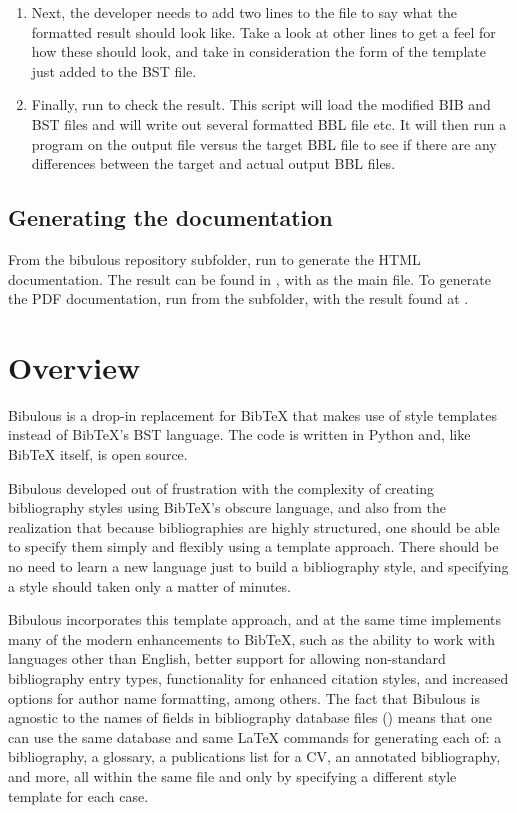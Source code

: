 \documentclass[letterpaper,10pt,english]{sphinxmanual}
\begin{document}
\begin{enumerate}
\item {} 
Next, the developer needs to add two lines to the  file to say what the formatted result should look like. Take a look at other lines to get a feel for how these should look, and take in consideration the form of the template just added to the BST file.

\item {} 
Finally, run  to check the result. This script will load the modified BIB and BST files and will write out several formatted BBL file  etc. It will then run a  program on the output file versus the target BBL file to see if there are any differences between the target and actual output BBL files.

\end{enumerate}


\section{Generating the documentation}
\label{developer_guide:generating-the-documentation}
From the bibulous repository  subfolder, run  to generate the HTML documentation. The result can be found in , with  as the main file. To generate the PDF documentation, run  from the  subfolder, with the result found at .


\chapter{Overview}
\label{index:overview}
Bibulous is a drop-in replacement for BibTeX that makes use of style templates instead of BibTeX's BST language. The code is written in Python and, like BibTeX itself, is open source.

Bibulous developed out of frustration with the complexity of creating bibliography styles using BibTeX's obscure language, and also from the realization that because bibliographies are highly structured, one should be able to specify them simply and flexibly using a template approach. There should be no need to learn a new language just to build a bibliography style, and specifying a style should taken only a matter of minutes.

Bibulous incorporates this template approach, and at the same time implements many of the modern enhancements to BibTeX, such as the ability to work with languages other than English, better support for allowing non-standard bibliography entry types, functionality for enhanced citation styles, and increased options for author name formatting, among others. The fact that Bibulous is agnostic to the names of fields in bibliography database files () means that one can use the same database and same LaTeX commands for generating each of: a bibliography, a glossary, a publications list for a CV, an annotated bibliography, and more, all within the same file and only by specifying a different style template for each case.
\end{document}
